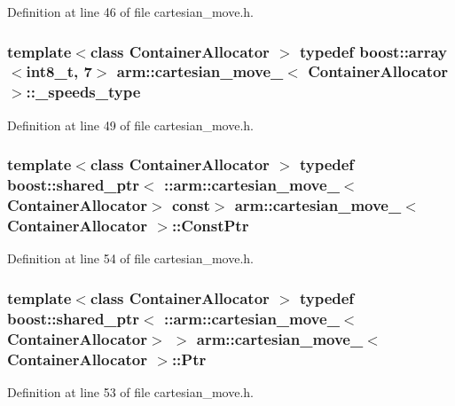 \-Definition at line 46 of file cartesian\-\_\-move.\-h.

\subsubsection[{\-\_\-speeds\-\_\-type}]{\setlength{\rightskip}{0pt plus 5cm}template$<$class Container\-Allocator $>$ typedef boost\-::array$<$int8\-\_\-t, 7$>$ {\bf arm\-::cartesian\-\_\-move\-\_\-}$<$ \-Container\-Allocator $>$\-::{\bf \-\_\-speeds\-\_\-type}}\label{structarm_1_1cartesian__move___a18921ec50238a3ad99111ea39fc0996b}


\-Definition at line 49 of file cartesian\-\_\-move.\-h.

\subsubsection[{\-Const\-Ptr}]{\setlength{\rightskip}{0pt plus 5cm}template$<$class Container\-Allocator $>$ typedef boost\-::shared\-\_\-ptr$<$ \-::{\bf arm\-::cartesian\-\_\-move\-\_\-}$<$\-Container\-Allocator$>$ const$>$ {\bf arm\-::cartesian\-\_\-move\-\_\-}$<$ \-Container\-Allocator $>$\-::{\bf \-Const\-Ptr}}\label{structarm_1_1cartesian__move___a5832e205503d5a9c647db2e62f30461b}


\-Definition at line 54 of file cartesian\-\_\-move.\-h.

\subsubsection[{\-Ptr}]{\setlength{\rightskip}{0pt plus 5cm}template$<$class Container\-Allocator $>$ typedef boost\-::shared\-\_\-ptr$<$ \-::{\bf arm\-::cartesian\-\_\-move\-\_\-}$<$\-Container\-Allocator$>$ $>$ {\bf arm\-::cartesian\-\_\-move\-\_\-}$<$ \-Container\-Allocator $>$\-::{\bf \-Ptr}}\label{structarm_1_1cartesian__move___a89b6210824033054c3a2b983371adb97}


\-Definition at line 53 of file cartesian\-\_\-move.\-h.

